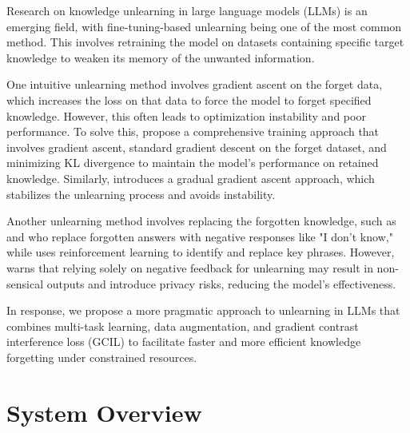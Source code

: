 \documentclass[11pt]{article}
\begin{document}
Research on knowledge unlearning in large language models (LLMs) is an emerging field, with fine-tuning-based unlearning being one of the most common method. This involves retraining the model on datasets containing specific target knowledge to weaken its memory of the unwanted information.

One intuitive unlearning method involves gradient ascent on the forget data, which increases the loss on that data to force the model to forget specified knowledge. However, this often leads to optimization instability and poor performance. To solve this, \citet{veldanda2024llm} propose a comprehensive training approach that involves gradient ascent, standard gradient descent on the forget dataset, and minimizing KL divergence to maintain the model’s performance on retained knowledge. Similarly, \citet{jang2022knowledge} introduces a gradual gradient ascent approach, which stabilizes the unlearning process and avoids instability. 

Another unlearning method involves replacing the forgotten knowledge, such as \citet{choi2024snap} and \citet{shi2024ulmr} who replace forgotten answers with negative responses like "I don't know," while \citet{eldan2023s} uses reinforcement learning to identify and replace key phrases. However, \citet{mekala2024alternate} warns that relying solely on negative feedback for unlearning may result in non-sensical outputs and introduce privacy risks, reducing the model's effectiveness.

In response, we propose a more pragmatic approach to unlearning in LLMs that combines multi-task learning, data augmentation, and gradient contrast interference loss (GCIL) to facilitate faster and more efficient knowledge forgetting under constrained resources.



\section{System Overview}
\end{document}
